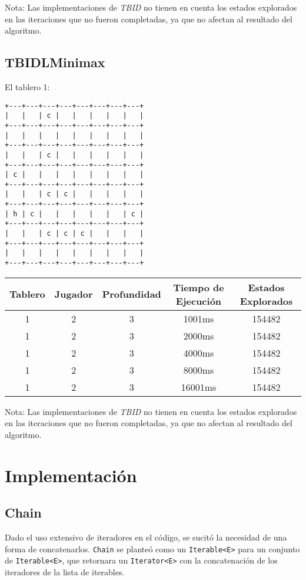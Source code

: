 \documentclass[10pt,a4paper,notitlepage]{article}
\begin{document}
Nota: Las implementaciones de \textit{TBID} no tienen en cuenta los estados explorados en las iteraciones que no fueron completadas, ya que no afectan al resultado del algoritmo.

\newpage
\subsection{TBIDLMinimax}
El tablero 1:
\begin{verbatim}
+---+---+---+---+---+---+---+---+
|   |   | c |   |   |   |   |   |
+---+---+---+---+---+---+---+---+
|   |   |   |   |   |   |   |   |
+---+---+---+---+---+---+---+---+
|   |   | c |   |   |   |   |   |
+---+---+---+---+---+---+---+---+
| c |   |   |   |   |   |   |   |
+---+---+---+---+---+---+---+---+
|   |   | c | c |   |   |   |   |
+---+---+---+---+---+---+---+---+
| h | c |   |   |   |   |   | c |
+---+---+---+---+---+---+---+---+
|   |   | c | c | c |   |   |   |
+---+---+---+---+---+---+---+---+
|   |   |   |   |   |   |   |   |
+---+---+---+---+---+---+---+---+
\end{verbatim}
\begin{tabular}{|c|c|c|c|c|}
\hline
Tablero & Jugador & Profundidad & Tiempo de Ejecución & Estados Explorados \\
\hline
\hline
1&2&3&1001ms&154482\\
\hline
1&2&3&2000ms&154482\\
\hline
1&2&3&4000ms&154482\\
\hline
1&2&3&8000ms&154482\\
\hline
1&2&3&16001ms&154482\\
\hline
\end{tabular}

Nota: Las implementaciones de \textit{TBID} no tienen en cuenta los estados explorados en las iteraciones que no fueron completadas, ya que no afectan al resultado del algoritmo.

\newpage
\section{Implementación}
\subsection{Chain}
Dado el uso extensivo de iteradores en el código, se sucitó la necesidad de una forma de concatenarlos. \texttt{Chain} se planteó como un \texttt{Iterable<E>} para un conjunto de \texttt{Iterable<E>}, que retornara un \texttt{Iterator<E>} con la concatenación de los iteradores de la lista de iterables.
\end{document}
